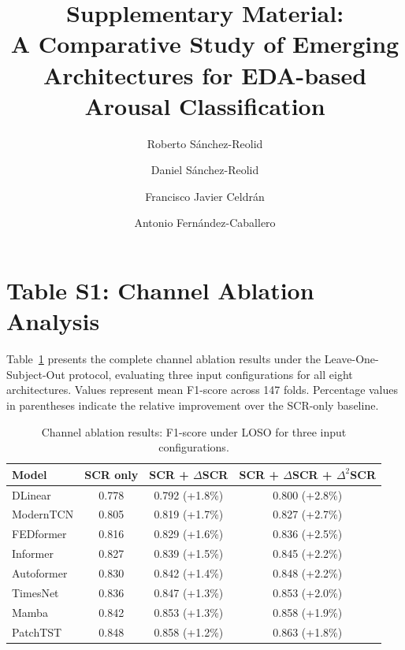 \documentclass[runningheads]{llncs}
\begin{document}
\title{Supplementary Material:\\
A Comparative Study of Emerging Architectures for EDA-based Arousal Classification}

\author{Roberto S\'{a}nchez-Reolid \and Daniel S\'{a}nchez-Reolid \and Francisco Javier Celdr\'{a}n \and Antonio Fern\'{a}ndez-Caballero}

\maketitle

\section*{Table S1: Channel Ablation Analysis}

Table~\ref{tab:s1_channel} presents the complete channel ablation results under the Leave-One-Subject-Out protocol, evaluating three input configurations for all eight architectures. Values represent mean F1-score across 147 folds. Percentage values in parentheses indicate the relative improvement over the SCR-only baseline.

\begin{table}[ht]
\centering
\caption{Channel ablation results: F1-score under LOSO for three input configurations.}
\label{tab:s1_channel}
\begin{tabular}{lccc}
\toprule
Model & SCR only & SCR + $\Delta$SCR & SCR + $\Delta$SCR + $\Delta^2$SCR \\
\midrule
DLinear   & 0.778 & 0.792 (+1.8\%) & 0.800 (+2.8\%) \\
ModernTCN & 0.805 & 0.819 (+1.7\%) & 0.827 (+2.7\%) \\
FEDformer  & 0.816 & 0.829 (+1.6\%) & 0.836 (+2.5\%) \\
Informer  & 0.827 & 0.839 (+1.5\%) & 0.845 (+2.2\%) \\
Autoformer & 0.830 & 0.842 (+1.4\%) & 0.848 (+2.2\%) \\
TimesNet  & 0.836 & 0.847 (+1.3\%) & 0.853 (+2.0\%) \\
Mamba     & 0.842 & 0.853 (+1.3\%) & 0.858 (+1.9\%) \\
PatchTST   & 0.848 & 0.858 (+1.2\%) & 0.863 (+1.8\%) \\
\bottomrule
\end{tabular}
\end{table}
\end{document}
